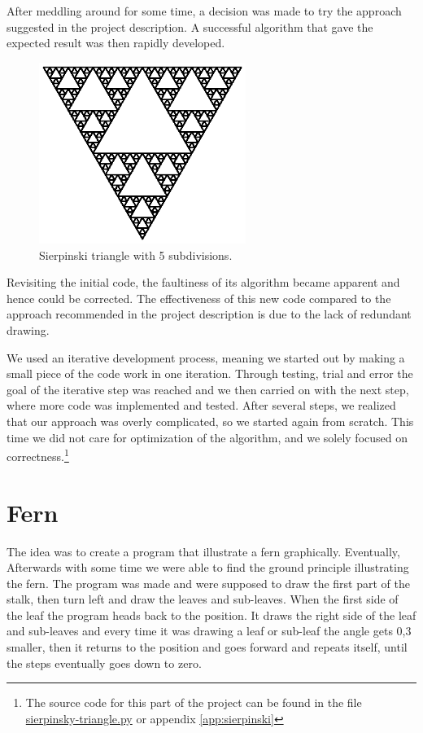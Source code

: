 \documentclass[titlepage]{article}
\begin{document}
After meddling around for some time, a decision was made to try the approach suggested in the project description. A successful algorithm that gave the expected result was then rapidly developed.
\begin{figure}[H]
  
  \includegraphics[width=0.6\textwidth]{triangle}
  \caption{Sierpinski triangle with 5 subdivisions.}
\end{figure}
Revisiting the initial code, the faultiness of its algorithm became apparent and hence could be corrected. The effectiveness of this new code compared to the approach recommended in the project description is due to the lack of redundant drawing. \par We used an iterative development process, meaning we started out by making a small piece of the code work in one iteration. Through testing, trial and error the goal of the iterative step was reached and we then carried on with the next step, where more code was implemented and tested. After several steps, we realized that our approach was overly complicated, so we started again from scratch. This time we did not care for optimization of the algorithm, and we solely focused on correctness.\footnote{The source code for this part of the project can be found in the file \href{https://github.com/ErikAndersen81/DM550-FractalProject/blob/master/sierpinsky-triangle.py}{sierpinsky-triangle.py} or appendix \ref{app:sierpinski}}

\section{Fern}
The idea was to create a program that illustrate a fern graphically. Eventually, Afterwards with some time we were able to find the ground principle illustrating the fern. The program was made and were supposed to draw the first part of the stalk, then turn left and draw the leaves and sub-leaves. When the first side of the leaf the program heads back to the position. It draws the right side of the leaf and sub-leaves and every time it was drawing a leaf or sub-leaf the angle gets 0,3 smaller, then it returns to the position and goes forward and repeats itself, until the steps eventually goes down to zero.
\end{document}

